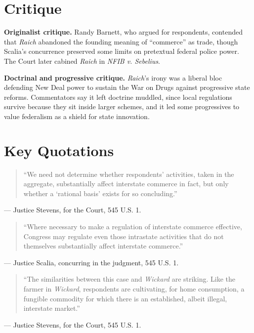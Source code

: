 \documentclass[12pt]{article}
\begin{document}
\section{Critique}

\textbf{Originalist critique.} Randy Barnett, who argued for respondents, contended that \textit{Raich} abandoned the founding meaning of ``commerce'' as trade, though Scalia's concurrence preserved some limits on pretextual federal police power. The Court later cabined \textit{Raich} in \textit{NFIB v. Sebelius}.

\textbf{Doctrinal and progressive critique.} \textit{Raich}'s irony was a liberal bloc defending New Deal power to sustain the War on Drugs against progressive state reforms. Commentators say it left doctrine muddled, since local regulations survive because they sit inside larger schemes, and it led some progressives to value federalism as a shield for state innovation.

\section{Key Quotations}

\begin{quote}
``We need not determine whether respondents' activities, taken in the aggregate, substantially affect interstate commerce in fact, but only whether a `rational basis' exists for so concluding.''
\end{quote}
\noindent --- Justice Stevens, for the Court, 545 U.S. 1.

\begin{quote}
``Where necessary to make a regulation of interstate commerce effective, Congress may regulate even those intrastate activities that do not themselves substantially affect interstate commerce.''
\end{quote}
\noindent --- Justice Scalia, concurring in the judgment, 545 U.S. 1.

\begin{quote}
``The similarities between this case and \textit{Wickard} are striking. Like the farmer in \textit{Wickard}, respondents are cultivating, for home consumption, a fungible commodity for which there is an established, albeit illegal, interstate market.''
\end{quote}
\noindent --- Justice Stevens, for the Court, 545 U.S. 1.
\end{document}
